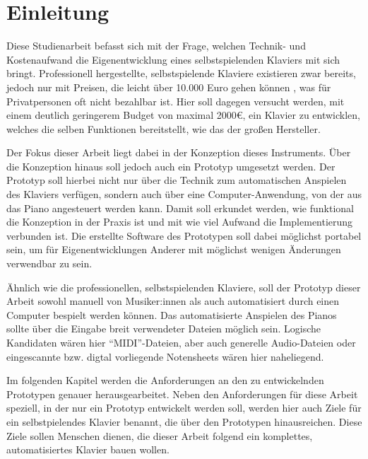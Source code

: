 
\chapter{Einleitung} \label{einleitung}

Diese Studienarbeit befasst sich mit der Frage, welchen Technik- und Kostenaufwand die Eigenentwicklung eines selbstspielenden Klaviers mit sich bringt.
Professionell hergestellte, selbstspielende Klaviere existieren zwar bereits,
jedoch nur mit Preisen, die leicht über 10.000 Euro gehen können \cite{YamahaU1}, was für Privatpersonen oft nicht bezahlbar ist.
Hier soll dagegen versucht werden, mit einem deutlich geringerem Budget von maximal 2000\euro{}, ein Klavier zu entwicklen, welches die selben Funktionen bereitstellt, wie das der großen Hersteller.


Der Fokus dieser Arbeit liegt dabei in der Konzeption dieses Instruments.
Über die Konzeption hinaus soll jedoch auch ein Prototyp umgesetzt werden.
Der Prototyp soll hierbei nicht nur über die Technik zum automatischen Anspielen des Klaviers verfügen, sondern auch über eine Computer-Anwendung, von der aus das Piano angesteuert werden kann.
Damit soll erkundet werden, wie funktional die Konzeption in der Praxis ist und mit wie viel Aufwand die Implementierung verbunden ist.
Die erstellte Software des Prototypen soll dabei möglichst portabel sein, um für Eigenentwicklungen Anderer mit möglichst wenigen Änderungen verwendbar zu sein.

Ähnlich wie die professionellen, selbstspielenden Klaviere, soll der Prototyp dieser Arbeit sowohl manuell von Musiker:innen als auch automatisiert durch einen Computer bespielt werden können.
Das automatisierte Anspielen des Pianos sollte über die Eingabe breit verwendeter Dateien möglich sein.
Logische Kandidaten wären hier \enquote{\ac{MIDI}}-Dateien, aber auch generelle Audio-Dateien oder eingescannte bzw. digtal vorliegende Notensheets wären hier naheliegend.

Im folgenden Kapitel werden die Anforderungen an den zu entwickelnden Prototypen genauer herausgearbeitet.
Neben den Anforderungen für diese Arbeit speziell, in der nur ein Prototyp entwickelt werden soll,
werden hier auch Ziele für ein selbstpielendes Klavier benannt, die über den Prototypen hinausreichen.
Diese Ziele sollen Menschen dienen, die dieser Arbeit folgend ein komplettes, automatisiertes Klavier bauen wollen.

